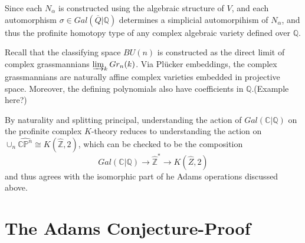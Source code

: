 \documentclass{article}
\theoremstyle{definition}
\theoremstyle{definition}
\theoremstyle{definition}
\theoremstyle{definition}
\theoremstyle{definition}
\theoremstyle{definition}
\theoremstyle{definition}
\begin{document}
Since each $N_{\alpha}$ is constructed using the algebraic structure of $V$, and each automorphism $\sigma\in Gal(\overline{Q}|\mathbb{Q})$ determines a simplicial automorpihism of $N_{\alpha}$, and thus the profinite homotopy type of any complex algebraic variety defined over $\mathbb{Q}$.

Recall that the classifying space $BU(n)$ is constructed as the direct limit of complex grassmannians $\varinjlim_{k}Gr_n(k)$. Via Pl\"{u}cker embeddings, the complex grassmannians are naturally affine complex varieties embedded in projective space. Moreover, the defining polynomials also have coefficients in $\mathbb{Q}$.(Example here?)


By naturality and splitting principal, understanding the action of $Gal(\mathbb{C}|\mathbb{Q})$ on the profinite complex $K$-theory reduces to understanding the action on $\cup_n \widehat{\mathbb{CP}^n}\cong K(\widehat{\mathbb{Z}},2)$, which can be checked to be the composition 
\[Gal(\mathbb{C}|\mathbb{Q})\to \widehat{\mathbb{Z}}^*\to K(\widehat{Z},2)\]
and thus agrees with the isomorphic part of he Adams operations discussed above. 

\section{The Adams Conjecture-Proof}
\end{document}
